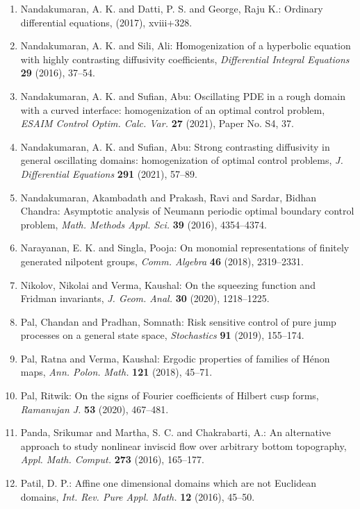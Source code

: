 \begin{enumerate}
{C}hapman-{C}ostas-{S}antos identities, \emph{Discrete Math.} {\bf 342} (2019), 1577--1580.
\item Nandakumaran, A. K. and Datti, P. S. and George, Raju K.: Ordinary differential equations, \emph{} {\bf } (2017), xviii+328.
\item Nandakumaran, A. K. and Sili, Ali: Homogenization of a hyperbolic equation with highly
contrasting diffusivity coefficients, \emph{Differential Integral Equations} {\bf 29} (2016), 37--54.
\item Nandakumaran, A. K. and Sufian, Abu: Oscillating {PDE} in a rough domain with a curved interface:
homogenization of an optimal control problem, \emph{ESAIM Control Optim. Calc. Var.} {\bf 27} (2021), Paper No. S4, 37.
\item Nandakumaran, A. K. and Sufian, Abu: Strong contrasting diffusivity in general oscillating domains:
homogenization of optimal control problems, \emph{J. Differential Equations} {\bf 291} (2021), 57--89.
\item Nandakumaran, Akambadath and Prakash, Ravi and Sardar, Bidhan
Chandra: Asymptotic analysis of {N}eumann periodic optimal boundary
control problem, \emph{Math. Methods Appl. Sci.} {\bf 39} (2016), 4354--4374.
\item Narayanan, E. K. and Singla, Pooja: On monomial representations of finitely generated nilpotent
groups, \emph{Comm. Algebra} {\bf 46} (2018), 2319--2331.
\item Nikolov, Nikolai and Verma, Kaushal: On the squeezing function and {F}ridman invariants, \emph{J. Geom. Anal.} {\bf 30} (2020), 1218--1225.
\item Pal, Chandan and Pradhan, Somnath: Risk sensitive control of pure jump processes on a general
state space, \emph{Stochastics} {\bf 91} (2019), 155--174.
\item Pal, Ratna and Verma, Kaushal: Ergodic properties of families of {H}\'{e}non maps, \emph{Ann. Polon. Math.} {\bf 121} (2018), 45--71.
\item Pal, Ritwik: On the signs of {F}ourier coefficients of {H}ilbert cusp
forms, \emph{Ramanujan J.} {\bf 53} (2020), 467--481.
\item Panda, Srikumar and Martha, S. C. and Chakrabarti, A.: An alternative approach to study nonlinear inviscid flow over
arbitrary bottom topography, \emph{Appl. Math. Comput.} {\bf 273} (2016), 165--177.
\item Patil, D. P.: Affine one dimensional domains which are not {E}uclidean
domains, \emph{Int. Rev. Pure Appl. Math.} {\bf 12} (2016), 45--50.

\end{enumerate}
